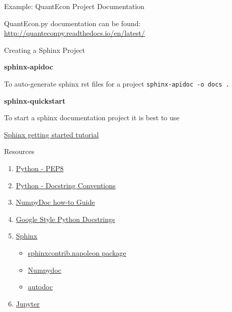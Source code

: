 \documentclass{beamer}
\begin{document}
\begin{frame}{Example: QuantEcon Project Documentation}

QuantEcon.py documentation can be found: \url{http://quanteconpy.readthedocs.io/en/latest/}

\end{frame}

\begin{frame}[fragile]{Creating a Sphinx Project}

\textbf{sphinx-apidoc}

To auto-generate sphinx rst files for a project \texttt{sphinx-apidoc -o docs .} 

\textbf{sphinx-quickstart}

To start a sphinx documentation project it is best to use 

\href{http://www.sphinx-doc.org/en/stable/tutorial.html}{Sphinx getting started tutorial}

\end{frame}

\begin{frame}{Resources}
\begin{enumerate}
\item \href{https://www.python.org/dev/peps/pep-0008/}{Python - PEP8}
\item \href{https://www.python.org/dev/peps/pep-0257/}{Python - Docstring Conventions}
\item \href{https://github.com/numpy/numpy/blob/master/doc/HOWTO_DOCUMENT.rst.txt}{NumpyDoc how-to Guide}
\item \href{http://sphinxcontrib-napoleon.readthedocs.io/en/latest/example_google.html}{Google Style Python Docstrings}
\item \href{http://www.sphinx-doc.org/en/stable/}{Sphinx}
\begin{itemize}
  \item \href{http://sphinxcontrib-napoleon.readthedocs.io/en/latest/sphinxcontrib.napoleon.html}{sphinxcontrib.napoleon package}
  \item \href{https://github.com/numpy/numpydoc}{Numpydoc}
  \item \href{http://www.sphinx-doc.org/en/stable/ext/autodoc.html}{autodoc}
\end{itemize}
\item \href{http://jupyter.org/}{Jupyter}
\end{enumerate}
\end{frame}
\end{document}
